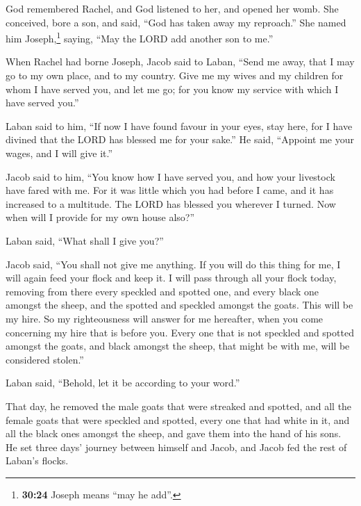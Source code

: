  God remembered Rachel, and God listened to her, and
opened her womb.  She conceived, bore a son, and said,
``God has taken away my reproach.''  She named him
Joseph,\footnote{\textbf{30:24} Joseph means ``may he add''.} saying,
``May the LORD add another son to me.''

 When Rachel had borne Joseph, Jacob said to Laban,
``Send me away, that I may go to my own place, and to my country.
 Give me my wives and my children for whom I have served
you, and let me go; for you know my service with which I have served
you.''

 Laban said to him, ``If now I have found favour in your
eyes, stay here, for I have divined that the LORD has blessed me for
your sake.''  He said, ``Appoint me your wages, and I
will give it.''

 Jacob said to him, ``You know how I have served you, and
how your livestock have fared with me.  For it was little
which you had before I came, and it has increased to a multitude. The
LORD has blessed you wherever I turned. Now when will I provide for my
own house also?''

 Laban said, ``What shall I give you?''

Jacob said, ``You shall not give me anything. If you will do this thing
for me, I will again feed your flock and keep it.  I will
pass through all your flock today, removing from there every speckled
and spotted one, and every black one amongst the sheep, and the spotted
and speckled amongst the goats. This will be my hire.  So
my righteousness will answer for me hereafter, when you come concerning
my hire that is before you. Every one that is not speckled and spotted
amongst the goats, and black amongst the sheep, that might be with me,
will be considered stolen.''

 Laban said, ``Behold, let it be according to your
word.''

 That day, he removed the male goats that were streaked
and spotted, and all the female goats that were speckled and spotted,
every one that had white in it, and all the black ones amongst the
sheep, and gave them into the hand of his sons.  He set
three days' journey between himself and Jacob, and Jacob fed the rest of
Laban's flocks.

